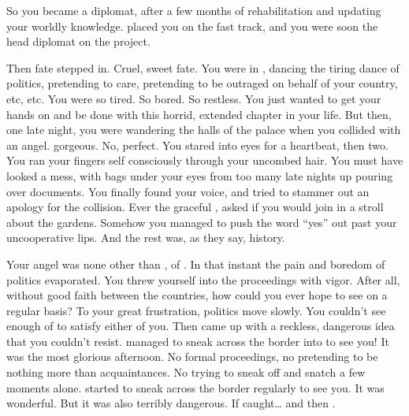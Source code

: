 \documentclass[char]{NeptuneBall}
\begin{document}
So you became a diplomat, after a few months of rehabilitation and updating your worldly knowledge.  \pAssassin{} placed you on the fast track, and you were soon the head diplomat on the project. 

Then fate stepped in. Cruel, sweet fate. You were in \pAtlantis{}, dancing the tiring dance of politics, pretending to care, pretending to be outraged on behalf of your country, etc, etc. You were so tired. So bored. So restless. You just wanted to get your hands on \cQueen{} and be done with this horrid, extended chapter in your life. But then, one late night, you were wandering the halls of the palace when you collided with an angel. \cPrincess{\They} \cPrincess{\were} gorgeous. No, \cPrincess{\they} \cPrincess{\were} perfect. You stared into \cPrincess{\their} eyes for a heartbeat, then two. You ran your fingers self consciously through your uncombed hair. You must have looked a mess, with bags under your eyes from too many late nights up pouring over documents.  You finally found your voice, and tried to stammer out an apology for the collision. Ever the graceful \cPrincess{\prince}, \cPrincess{\they} asked if you would join \cPrincess{\them} in a stroll about the gardens. Somehow you managed to push the word ``yes'' out past your uncooperative lips. And the rest was, as they say, history.

Your angel was none other than \cPrincess{}, \cPrincess{\prince} of \pAtlantis{}. In that instant the pain and boredom of politics evaporated. You threw yourself into the proceedings with vigor. After all, without good faith between the countries, how could you ever hope to see \cPrincess{} on a regular basis? To your great frustration, politics move slowly. You couldn't see enough of \cPrincess{} to satisfy either of you. Then \cPrincess{\they} came up with a reckless, dangerous idea that you couldn't resist. \cPrincess{\They} managed to sneak across the border into \pPacifica{} to see you! It was the most glorious afternoon. No formal proceedings, no pretending to be nothing more than acquaintances. No trying to sneak off and snatch a few moments alone. \cPrincess{\They} started to sneak across the border regularly to see you. It was wonderful. But it was also terribly dangerous. If \cPrincess{\they} \cPrincess{\were} caught\ldots{} and then \cPrincess{\they} \cPrincess{\were}.
\end{document}
